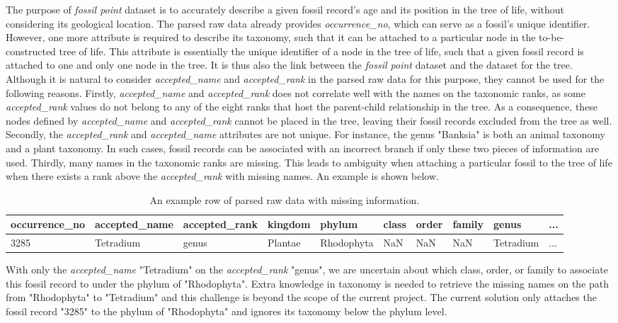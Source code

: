 \documentclass[11pt, a4paper,oneside,chapterprefix=false]{scrbook}
\begin{document}
The purpose of \emph{fossil point} dataset is to accurately describe a given fossil record's age and its position in the tree of life, without considering its geological location. The parsed raw data already provides \emph{occurrence\_no}, which can serve as a fossil's unique identifier. However, one more attribute is required to describe its taxonomy, such that it can be attached to a particular node in the to-be-constructed tree of life. This attribute is essentially the unique identifier of a node in the tree of life, such that a  given fossil record is attached to one and only one node in the tree. It is thus also the link between the \emph{fossil point} dataset and the dataset for the tree. Although it is natural to consider \emph{accepted\_name} and \emph{accepted\_rank} in the parsed raw data for this purpose, they cannot be used for the following reasons. Firstly, \emph{accepted\_name} and \emph{accepted\_rank} does not correlate well with the names on the taxonomic ranks, as some \emph{accepted\_rank} values do not belong to any of the eight ranks that host the parent-child relationship in the tree. As a consequence, these nodes defined by \emph{accepted\_name} and \emph{accepted\_rank} cannot be placed in the tree, leaving their fossil records excluded from the tree as well. Secondly, the \emph{accepted\_rank} and \emph{accepted\_name} attributes are not unique. For instance, the genus "Banksia" is both an animal taxonomy and a plant taxonomy. In such cases, fossil records can be associated with an incorrect branch if only these two pieces of information are used. Thirdly, many names in the taxonomic ranks are missing. This leads to ambiguity when attaching a particular fossil to the tree of life when there exists a rank above the \emph{accepted\_rank} with missing names. An example is shown below.

\begin{table}[h]
	\centering
	\begin{tabular}{|l|l|l|l|l|l|l|l|l|l|}
		\hline
		occurrence\_no &  accepted\_name & accepted\_rank & kingdom &	phylum & class & order & family & genus & ... \\ \hline
		3285 &  Tetradium & genus & Plantae & Rhodophyta & NaN & NaN & NaN & Tetradium & ... \\ \hline
	\end{tabular}
	\caption{An example row of parsed raw data with missing information.}
	\label{tab:missing_information}
\end{table}

With only the \emph{accepted\_name} "Tetradium" on the \emph{accepted\_rank} "genus", we are uncertain about which class, order, or family to associate this fossil record to under the phylum of "Rhodophyta". Extra knowledge in taxonomy is needed to retrieve the missing names on the path from "Rhodophyta" to "Tetradium" and this challenge is beyond the scope of the current project. The current solution only attaches the fossil record "3285" to the phylum of "Rhodophyta" and ignores its taxonomy below the phylum level. \\
\end{document}
